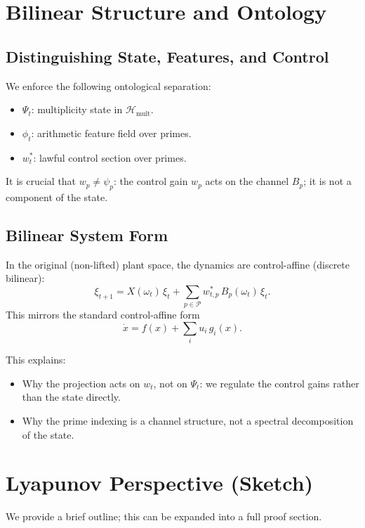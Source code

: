 \documentclass[11pt]{article}
\begin{document}
\section{Bilinear Structure and Ontology}

\subsection{Distinguishing State, Features, and Control}

We enforce the following ontological separation:
\begin{itemize}
  \item $\Psi_t$: multiplicity state in $\mathcal H_{\mathrm{mult}}$.
  \item $\phi_t$: arithmetic feature field over primes.
  \item $w_t^\ast$: lawful control section over primes.
\end{itemize}

It is crucial that $w_p\neq \psi_p$: the control gain $w_p$ acts on the channel $B_p$; it is not a component of the state.

\subsection{Bilinear System Form}

In the original (non-lifted) plant space, the dynamics are control-affine (discrete bilinear):
\begin{equation}
  \xi_{t+1}
  = X(\omega_t)\,\xi_t + \sum_{p\in\mathcal P} w_{t,p}^\ast\, B_p(\omega_t)\,\xi_t.
\end{equation}
This mirrors the standard control-affine form
\[
\dot x = f(x) + \sum_i u_i\, g_i(x).
\]

This explains:
\begin{itemize}
  \item Why the projection acts on $w_t$, not on $\Psi_t$: we regulate the control gains rather than the state directly.
  \item Why the prime indexing is a channel structure, not a spectral decomposition of the state.
\end{itemize}

\section{Lyapunov Perspective (Sketch)}

We provide a brief outline; this can be expanded into a full proof section.
\end{document}
